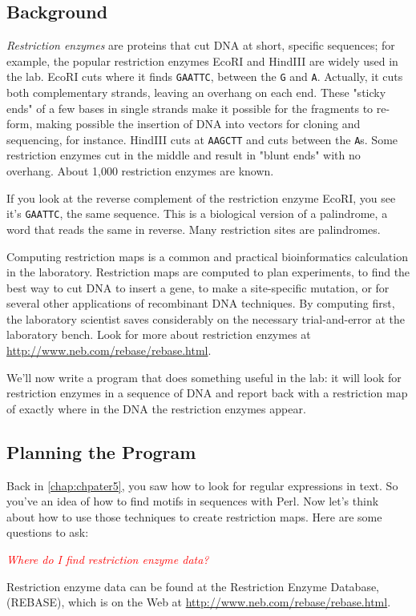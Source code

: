 \subsection{Background}
\textit{Restriction enzymes} are proteins that cut DNA at short, specific sequences; for example, the popular restriction enzymes EcoRI and HindIII are widely used in the lab. EcoRI cuts where it finds \verb|GAATTC|, between the \verb|G| and \verb|A|. Actually, it cuts both complementary strands, leaving an overhang on each end. These "sticky ends" of a few bases in single strands make it possible for the fragments to re-form, making possible the insertion of DNA into vectors for cloning and sequencing, for instance. HindIII cuts at \verb|AAGCTT| and cuts between the \verb|A|s. Some restriction enzymes cut in the middle and result in "blunt ends" with no overhang. About 1,000 restriction enzymes are known. 

If you look at the reverse complement of the restriction enzyme EcoRI, you see it's \verb|GAATTC|, the same sequence. This is a biological version of a palindrome, a word that reads the same in reverse. Many restriction sites are palindromes.

Computing restriction maps is a common and practical bioinformatics calculation in the laboratory. Restriction maps are computed to plan experiments, to find the best way to cut DNA to insert a gene, to make a site-specific mutation, or for several other applications of recombinant DNA techniques. By computing first, the laboratory scientist saves considerably on the necessary trial-and-error at the laboratory bench. Look for more about restriction enzymes at \href{http://www.neb.com/rebase/rebase.html}{http://www.neb.com/rebase/rebase.html}.

We'll now write a program that does something useful in the lab: it will look for restriction enzymes in a sequence of DNA and report back with a restriction map of exactly where in the DNA the restriction enzymes appear. 

\subsection{Planning the Program}
Back in \autoref{chap:chpater5}, you saw how to look for regular expressions in text. So you've an idea of how to find motifs in sequences with Perl. Now let's think about how to use those techniques to create restriction maps. Here are some questions to ask:

\textcolor{red}{\textit{Where do I find restriction enzyme data?}}
\begin{adjustwidth}{1cm}{}
Restriction enzyme data can be found at the Restriction Enzyme Database, (REBASE), which is on the Web at \href{http://www.neb.com/rebase/rebase.html}{http://www.neb.com/rebase/rebase.html}.
\end{adjustwidth}

